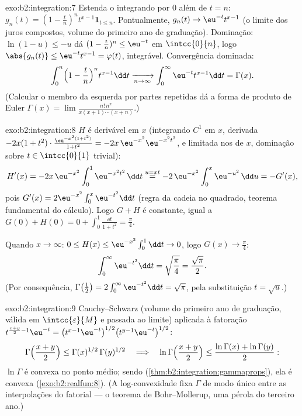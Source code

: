 \begin{solution}{exo:b2:integration:7}
Estenda o integrando por $0$ além de $t = n$: $g_n(t) = (1 -
\frac tn)^n t^{x-1}\mathbf{1}_{t \leq n}$. Pontualmente, $g_n(t) \to
\eu^{-t}t^{x-1}$ (o limite dos juros compostos, volume do primeiro ano de graduação).
Dominação: $\ln(1 - u) \leq -u$ dá $(1 - \frac tn)^n \leq
\eu^{-t}$ em $\intcc{0}{n}$, logo $\abs{g_n(t)} \leq
\eu^{-t}t^{x-1} = \varphi(t)$, integrável. Convergência dominada:
\[
\int_0^n \Bigl(1 - \frac tn\Bigr)^n t^{x-1}\dd t
\xrightarrow[n\to\infty]{} \int_0^\infty \eu^{-t}t^{x-1}\dd t
= \Gamma(x) .
\]
(Calcular o membro da esquerda por partes repetidas dá a forma de produto
de Euler $\Gamma(x) = \lim \frac{n!\,n^x}{x(x+1)\cdots(x+n)}$.)
\end{solution}

\begin{solution}{exo:b2:integration:8}
$H$ é derivável em $x$ (integrando $C^1$ em $x$, derivada
$-2x(1+t^2)\cdot\frac{\eu^{-x^2(1+t^2)}}{1+t^2} =
-2x\,\eu^{-x^2}\eu^{-x^2t^2}$,  e limitada nos 
de $x$, dominação sobre $t \in \intcc{0}{1}$ trivial):
\[
H'(x) = -2x\,\eu^{-x^2}\int_0^1 \eu^{-x^2t^2}\,\dd t
\overset{u = xt}{=} -2\,\eu^{-x^2}\int_0^x \eu^{-u^2}\,\dd u
= -G'(x),
\]
pois $G'(x) = 2\eu^{-x^2}\int_0^x \eu^{-t^2}\dd t$ (regra da cadeia no
quadrado, teorema fundamental do cálculo). Logo $G + H$ é
constante, igual a $G(0) + H(0) = 0 + \int_0^1 \frac{\dd t}{1+t^2}
= \frac\pi4$.

Quando $x \to \infty$: $0 \leq H(x) \leq \eu^{-x^2}\int_0^1 \dd t \to
0$, logo $G(x) \to \frac\pi4$:
\[
\int_0^\infty \eu^{-t^2}\dd t = \sqrt{\frac\pi4} =
\frac{\sqrt\pi}{2} .
\]
(Por consequência, $\Gamma\bigl(\frac12\bigr) = 2\int_0^\infty
\eu^{-t^2}\dd t = \sqrt\pi$, pela substituição $t = \sqrt u$.)
\end{solution}

\begin{solution}{exo:b2:integration:9}
Cauchy--Schwarz (volume do primeiro ano de graduação, válida em $\intcc{\varepsilon}{M}$
e passada ao limite) aplicada à fatoração
$t^{\frac{x+y}{2}-1}\eu^{-t} = \bigl(t^{x-1}\eu^{-t}\bigr)^{1/2}
\bigl(t^{y-1}\eu^{-t}\bigr)^{1/2}$:
\[
\Gamma\Bigl(\frac{x+y}{2}\Bigr) \leq
\Gamma(x)^{1/2}\,\Gamma(y)^{1/2}
\quad\Longrightarrow\quad
\ln\Gamma\Bigl(\frac{x+y}{2}\Bigr) \leq \frac{\ln\Gamma(x) +
\ln\Gamma(y)}{2} :
\]
$\ln\Gamma$ é convexa no ponto médio; sendo 
(\cref{thm:b2:integration:gammaprops}), ela é convexa
(\cref{exo:b2:realfun:8}). (A log-convexidade fixa $\Gamma$
de modo único entre as interpolações do fatorial --- o
teorema de Bohr--Mollerup, uma pérola do terceiro ano.)
\end{solution}

